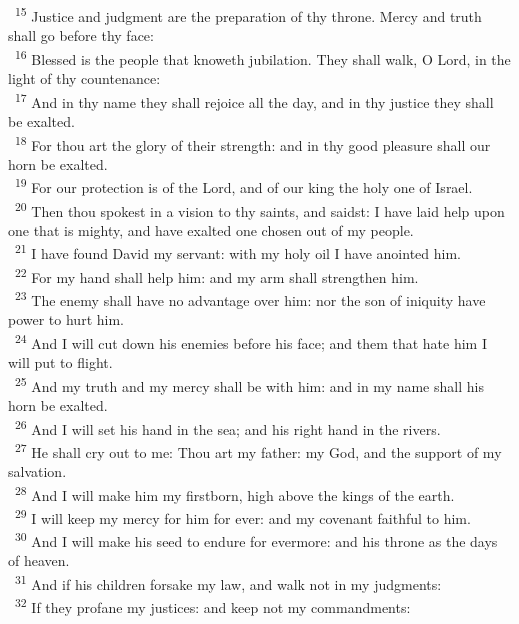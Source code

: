 \documentclass[a5paper,12pt]{article}
\begin{document}
\begin{multicols*}{2}
~\textsuperscript{15} Justice and judgment are the preparation of thy throne. Mercy and truth shall go before thy face:\\
~\textsuperscript{16} Blessed is the people that knoweth jubilation. They shall walk, O Lord, in the light of thy countenance:\\
~\textsuperscript{17} And in thy name they shall rejoice all the day, and in thy justice they shall be exalted.\\
~\textsuperscript{18} For thou art the glory of their strength: and in thy good pleasure shall our horn be exalted.\\
~\textsuperscript{19} For our protection is of the Lord, and of our king the holy one of Israel.\\
~\textsuperscript{20} Then thou spokest in a vision to thy saints, and saidst: I have laid help upon one that is mighty, and have exalted one chosen out of my people.\\
~\textsuperscript{21} I have found David my servant: with my holy oil I have anointed him.\\
~\textsuperscript{22} For my hand shall help him: and my arm shall strengthen him.\\
~\textsuperscript{23} The enemy shall have no advantage over him: nor the son of iniquity have power to hurt him.\\
~\textsuperscript{24} And I will cut down his enemies before his face; and them that hate him I will put to flight.\\
~\textsuperscript{25} And my truth and my mercy shall be with him: and in my name shall his horn be exalted.\\
~\textsuperscript{26} And I will set his hand in the sea; and his right hand in the rivers.\\
~\textsuperscript{27} He shall cry out to me: Thou art my father: my God, and the support of my salvation.\\
~\textsuperscript{28} And I will make him my firstborn, high above the kings of the earth.\\
~\textsuperscript{29} I will keep my mercy for him for ever: and my covenant faithful to him.\\
~\textsuperscript{30} And I will make his seed to endure for evermore: and his throne as the days of heaven.\\
~\textsuperscript{31} And if his children forsake my law, and walk not in my judgments:\\
~\textsuperscript{32} If they profane my justices: and keep not my commandments:\\

\end{multicols*}
\end{document}
